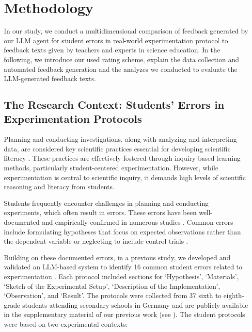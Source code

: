 \section{Methodology}

In our study, we conduct a multidimensional comparison of feedback generated by our LLM agent for student errors in real-world experimentation protocol to feedback texts given by teachers and experts in science education. In the following, we introduce our used rating scheme, explain the data collection and automated feedback generation and the analyzes we conducted to evaluate the LLM-generated feedback texts.

\subsection{The Research Context: Students' Errors in Experimentation Protocols}

Planning and conducting investigations, along with analyzing and interpreting data, are considered key scientific practices essential for developing scientific literacy \citep{NationalResearchCouncil2012}. These practices are effectively fostered through inquiry-based learning methods, particularly student-centered experimentation. However, while experimentation is central to scientific inquiry, it demands high levels of scientific reasoning and literacy from students.

Students frequently encounter challenges in planning and conducting experiments, which often result in errors. These errors have been well-documented and empirically confirmed in numerous studies \citep{kranz2023learners}. Common errors include formulating hypotheses that focus on expected observations rather than the dependent variable \citep{baur2018fehler} or neglecting to include control trials \citep{dasgupta2014development, germann1996identifying}.

Building on these documented errors, in a previous study, we developed and validated an LLM-based system to identify 16 common student errors related to experimentation \citep{bewersdorff2023assessing}. 
Each protocol included sections for `Hypothesis', `Materials', `Sketch of the Experimental Setup', `Description of the Implementation', `Observation', and `Result'. The protocols were collected from 37 sixth to eighth-grade students attending secondary schools in Germany and are publicly available in the supplementary material of our previous work (see \citet{bewersdorff2023assessing}). 
%
The student protocols were based on two experimental contexts:

